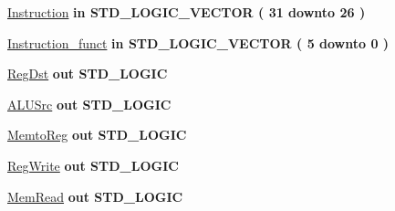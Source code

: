  \begin{DoxyCompactItemize}
\item 
\hypertarget{class_control_a35120c002e477a6e77c738ea1aaa5505}{\hyperlink{class_control_a35120c002e477a6e77c738ea1aaa5505}{\-Instruction}  {\bfseries {\bfseries in }} {\bfseries \-S\-T\-D\-\_\-\-L\-O\-G\-I\-C\-\_\-\-V\-E\-C\-T\-O\-R (   31    downto    26  ) } }\label{class_control_a35120c002e477a6e77c738ea1aaa5505}

\item 
\hypertarget{class_control_a837426aa7a23a4b3f1534d7a5a47fd84}{\hyperlink{class_control_a837426aa7a23a4b3f1534d7a5a47fd84}{\-Instruction\-\_\-funct}  {\bfseries {\bfseries in }} {\bfseries \-S\-T\-D\-\_\-\-L\-O\-G\-I\-C\-\_\-\-V\-E\-C\-T\-O\-R (   5    downto    0  ) } }\label{class_control_a837426aa7a23a4b3f1534d7a5a47fd84}

\item 
\hypertarget{class_control_a3e8450f5ca7972a364f6eaffec9c86a2}{\hyperlink{class_control_a3e8450f5ca7972a364f6eaffec9c86a2}{\-Reg\-Dst}  {\bfseries {\bfseries out }} {\bfseries \-S\-T\-D\-\_\-\-L\-O\-G\-I\-C } }\label{class_control_a3e8450f5ca7972a364f6eaffec9c86a2}

\item 
\hypertarget{class_control_aec5087b6dc490446af52e39d0264cf50}{\hyperlink{class_control_aec5087b6dc490446af52e39d0264cf50}{\-A\-L\-U\-Src}  {\bfseries {\bfseries out }} {\bfseries \-S\-T\-D\-\_\-\-L\-O\-G\-I\-C } }\label{class_control_aec5087b6dc490446af52e39d0264cf50}

\item 
\hypertarget{class_control_ae18caf473070cf8e735d12ca860fb762}{\hyperlink{class_control_ae18caf473070cf8e735d12ca860fb762}{\-Memto\-Reg}  {\bfseries {\bfseries out }} {\bfseries \-S\-T\-D\-\_\-\-L\-O\-G\-I\-C } }\label{class_control_ae18caf473070cf8e735d12ca860fb762}

\item 
\hypertarget{class_control_a3862189e11b01293ae0279072adc6151}{\hyperlink{class_control_a3862189e11b01293ae0279072adc6151}{\-Reg\-Write}  {\bfseries {\bfseries out }} {\bfseries \-S\-T\-D\-\_\-\-L\-O\-G\-I\-C } }\label{class_control_a3862189e11b01293ae0279072adc6151}

\item 
\hypertarget{class_control_a703e49c8be2a086810119a4f32c2edd0}{\hyperlink{class_control_a703e49c8be2a086810119a4f32c2edd0}{\-Mem\-Read}  {\bfseries {\bfseries out }} {\bfseries \-S\-T\-D\-\_\-\-L\-O\-G\-I\-C } }\label{class_control_a703e49c8be2a086810119a4f32c2edd0}


\end{DoxyCompactItemize}
